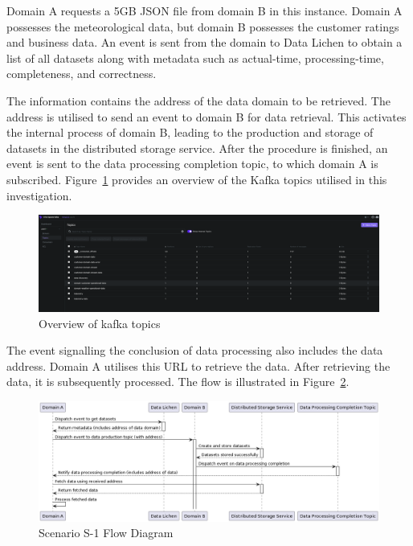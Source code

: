 \documentclass[preprint,12pt]{elsarticle}
\begin{document}
Domain A requests a 5GB JSON file from domain B in this instance. Domain A possesses the meteorological data, but domain B possesses the customer ratings and business data. An event is sent from the domain to Data Lichen to obtain a list of all datasets along with metadata such as actual-time, processing-time, completeness, and correctness. 

The information contains the address of the data domain to be retrieved. The address is utilised to send an event to domain B for data retrieval. This activates the internal process of domain B, leading to the production and storage of datasets in the distributed storage service. After the procedure is finished, an event is sent to the data processing completion topic, to which domain A is subscribed. Figure~\ref{kafkaTopics} provides an overview of the Kafka topics utilised in this investigation.

\begin{figure}[h!]
  \centering
  \includegraphics[width=\textwidth]{images/kafka-topics.png}
  \caption{Overview of kafka topics}
  \label{kafkaTopics}
\end{figure}

The event signalling the conclusion of data processing also includes the data address. Domain A utilises this URL to retrieve the data. After retrieving the data, it is subsequently processed. The flow is illustrated in Figure~\ref{s1Flow}.

\begin{figure}[h!]
  \centering
  \includegraphics[width=\textwidth]{images/Scenario-s1.png}
  \caption{Scenario S-1 Flow Diagram}
  \label{s1Flow}
\end{figure}
\end{document}
